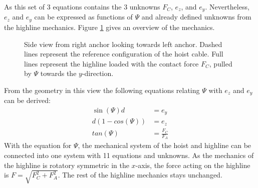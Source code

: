\documentclass[a4paper,10pt]{scrartcl}
\begin{document}
As this set of 3 equations contains the 3 unknowns $F_C$, $e_z$, and $e_y$. Nevertheless, $e_z$ and $e_y$ can be expressed as functions of $\Psi$ and already defined unknowns from the highline mechanics. Figure \ref{fig::2d::highline_side} gives an overview of the mechanics.

\begin{figure}[ht]
\centering
{}
\caption{Side view from right anchor looking towards left anchor. Dashed lines represent the reference configuration of the hoist cable. Full lines represent the highline loaded with the contact force $F_C$, pulled by $\Psi$ towards the $y$-direction.}
\label{fig::2d::highline_side}
\end{figure}

From the geometry in this view the following equations relating $\Psi$ with $e_z$ and $e_y$ can be derived:
\begin{align*}
\sin(\Psi) d &= e_y \\
d(1-cos(\Psi)) &= e_z \\
tan(\Psi) &=\frac{F_C}{F_A}
\end{align*}
With the equation for $\Psi$, the mechanical system of the hoist and highline can be connected into one system with 11 equations and unknowns. As the mechanics of the highline is rotatory symmetric in the $x$-axis, the force acting on the highline is $F=\sqrt{F_C^2+F_A^2}$. The rest of the highline mechanics stays unchanged. 
\end{document}

